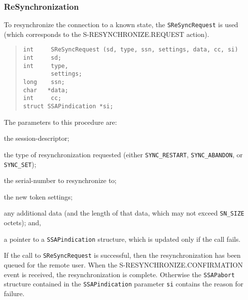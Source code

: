 \subsubsection	{ReSynchronization}
To resynchronize the connection to a known state,
the \verb"SReSyncRequest" is used
(which corresponds to the {\sf S-RESYNCHRONIZE.REQUEST\/} action).
\begin{quote}\small\begin{verbatim}
int     SReSyncRequest (sd, type, ssn, settings, data, cc, si)
int     sd;
int     type,
        settings;
long    ssn;
char   *data;
int     cc;
struct SSAPindication *si;
\end{verbatim}\end{quote}
The parameters to this procedure are:
\begin{describe}
\item[\verb"sd":] the session-descriptor;

\item[\verb"type":] the type of resynchronization requested
(either \verb"SYNC_RESTART", \verb"SYNC_ABANDON",
or \verb"SYNC_SET");

\item[\verb"ssn":] the serial-number to resynchronize to;

\item[\verb"settings":] the new token settings;

\item[\verb"data"/\verb"cc":] any additional data
(and the length of that data, which may not exceed \verb"SN_SIZE" octets);
and,

\item[\verb"si":] a pointer to a \verb"SSAPindication" structure, which is
updated only if the call fails.
\end{describe}
If the call to \verb"SReSyncRequest" is successful,
then the resynchronization has been queued for the remote user.
When the {\sf S-RESYNCHRONIZE.CON\-FIR\-MA\-TION\/} event is received,
the resynchronization is complete.
Otherwise the \verb"SSAPabort" structure contained in
the \verb"SSAPindication" parameter
\verb"si" contains the reason for failure.

